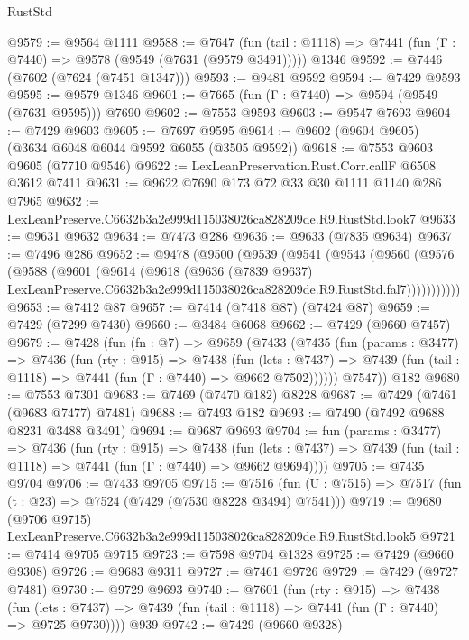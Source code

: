 \begin{lexlean}{RustStd}
\begin{coremodule}
@9579 := @9564 @1111
@9588 := @7647
    (fun (tail : @1118) => @7441 (fun (Γ : @7440) => @9578 (@9549 (@7631 (@9579 @3491)))))
    @1346
@9592 := @7446 (@7602 (@7624 (@7451 @1347)))
@9593 := @9481 @9592
@9594 := @7429 @9593
@9595 := @9579 @1346
@9601 := @7665 (fun (Γ : @7440) => @9594 (@9549 (@7631 @9595))) @7690
@9602 := @7553 @9593
@9603 := @9547 @7693
@9604 := @7429 @9603
@9605 := @7697 @9595
@9614 := @9602 (@9604 @9605) (@3634 @6048 @6044 @9592 @6055 (@3505 @9592))
@9618 := @7553 @9603 @9605 (@7710 @9546)
@9622 := LexLeanPreservation.Rust.Corr.callF @6508 @3612 @7411
@9631 := @9622 @7690 @173 @72 @33 @30 @1111 @1140 @286 @7965
@9632 := LexLeanPreserve.C6632b3a2e999d115038026ca828209de.R9.RustStd.look7
@9633 := @9631 @9632
@9634 := @7473 @286
@9636 := @9633 (@7835 @9634)
@9637 := @7496 @286
@9652 := @9478
    (@9500
      (@9539
        (@9541
          (@9543
            (@9560
              (@9576
                (@9588
                  (@9601
                    (@9614
                      (@9618
                        (@9636
                          (@7839 @9637)
                          LexLeanPreserve.C6632b3a2e999d115038026ca828209de.R9.RustStd.fal7)))))))))))
@9653 := @7412 @87
@9657 := @7414 (@7418 @87) (@7424 @87)
@9659 := @7429 (@7299 @7430)
@9660 := @3484 @6068
@9662 := @7429 (@9660 @7457)
@9679 := @7428
    (fun (fn : @7) =>
    @9659
      (@7433
        (@7435
          (fun (params : @3477) =>
          @7436
            (fun (rty : @915) =>
            @7438
              (fun (lets : @7437) =>
              @7439 (fun (tail : @1118) => @7441 (fun (Γ : @7440) => @9662 @7502))))))
        @7547))
    @182
@9680 := @7553 @7301
@9683 := @7469 (@7470 @182) @8228
@9687 := @7429 (@7461 (@9683 @7477) @7481)
@9688 := @7493 @182
@9693 := @7490 (@7492 @9688 @8231 @3488 @3491)
@9694 := @9687 @9693
@9704 := fun (params : @3477) =>
  @7436
    (fun (rty : @915) =>
    @7438
      (fun (lets : @7437) => @7439 (fun (tail : @1118) => @7441 (fun (Γ : @7440) => @9662 @9694))))
@9705 := @7435 @9704
@9706 := @7433 @9705
@9715 := @7516 (fun (U : @7515) => @7517 (fun (t : @23) => @7524 (@7429 (@7530 @8228 @3494) @7541)))
@9719 := @9680 (@9706 @9715) LexLeanPreserve.C6632b3a2e999d115038026ca828209de.R9.RustStd.look5
@9721 := @7414 @9705 @9715
@9723 := @7598 @9704 @1328
@9725 := @7429 (@9660 @9308)
@9726 := @9683 @9311
@9727 := @7461 @9726
@9729 := @7429 (@9727 @7481)
@9730 := @9729 @9693
@9740 := @7601
    (fun (rty : @915) =>
    @7438
      (fun (lets : @7437) => @7439 (fun (tail : @1118) => @7441 (fun (Γ : @7440) => @9725 @9730))))
    @939
@9742 := @7429 (@9660 @9328)

\end{coremodule}
\end{lexlean}
